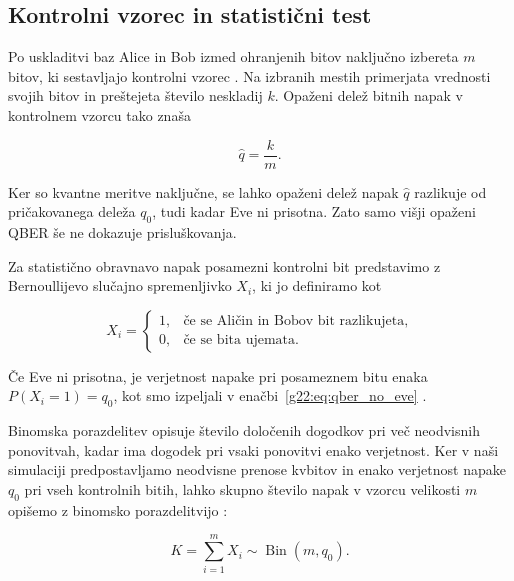 \subsection{Kontrolni vzorec in statistični test}
\label{g22:sec:test}


    Po uskladitvi baz Alice in Bob izmed ohranjenih bitov
    naključno izbereta $m$ bitov, ki sestavljajo kontrolni
    vzorec \cite{g22:lee2023detection, g22:fiorini2024estimating}.
    Na izbranih mestih primerjata vrednosti svojih
    bitov in preštejeta število neskladij $k$.
    Opaženi delež bitnih napak v kontrolnem vzorcu
    tako znaša \cite{g22:lee2023detection}

    \begin{equation}
        \hat{q}=\frac{k}{m}.
        \label{g22:eq:observed-qber}
    \end{equation}


Ker so kvantne meritve naključne, se lahko opaženi
delež napak $\hat{q}$ razlikuje od pričakovanega
deleža $q_0$, tudi kadar Eve ni prisotna.
Zato samo višji opaženi QBER še ne dokazuje
prisluškovanja.

Za statistično obravnavo napak posamezni kontrolni
bit predstavimo z Bernoullijevo slučajno spremenljivko
$X_i$, ki jo definiramo kot

\begin{equation}
    X_i =
    \begin{cases}
        1, & \text{če se Aličin in Bobov bit razlikujeta},\\
        0, & \text{če se bita ujemata}.
    \end{cases}
\end{equation}

Če Eve ni prisotna, je verjetnost napake pri
posameznem bitu enaka $P(X_i=1)=q_0$, kot smo
izpeljali v enačbi~\eqref{g22:eq:qber_no_eve}
\cite{g22:lee2023detection}.

Binomska porazdelitev opisuje število določenih
dogodkov pri več neodvisnih ponovitvah, kadar
ima dogodek pri vsaki ponovitvi enako verjetnost.
Ker v naši simulaciji predpostavljamo neodvisne
prenose kvbitov in enako verjetnost napake
$q_0$ pri vseh kontrolnih bitih, lahko skupno
število napak v vzorcu velikosti $m$
opišemo z binomsko porazdelitvijo
\cite{g22:scipy-binomial}:

\begin{equation}
    K = \sum_{i=1}^{m} X_i
    \sim \operatorname{Bin}(m,q_0).
    \label{g22:eq:binomial-model}
\end{equation}



